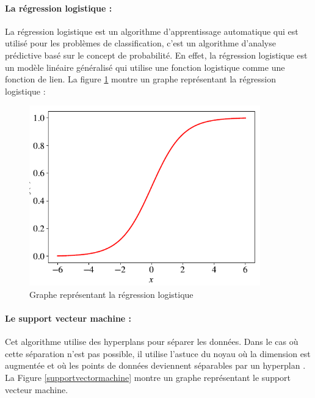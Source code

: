     \newpage

\paragraph{La régression logistique :}
La régression logistique est un algorithme d'apprentissage automatique qui est utilisé pour les problèmes de classification, c'est un algorithme d'analyse prédictive basé sur le concept de probabilité. En effet, la régression logistique est un modèle linéaire généralisé qui utilise une fonction logistique comme une fonction de lien. La figure \ref{lafonctionlogistique} montre un graphe représentant la régression logistique : 

\begin{figure}[h]
    \centering
    \includegraphics[width=10cm]{assets/PartOne/Chaptertwo/lafonctionlogistique.png}
    \caption{Graphe représentant la régression logistique}
    \label{lafonctionlogistique}
    \end{figure}


\paragraph{Le support vecteur machine : }
Cet algorithme utilise des hyperplans pour séparer les données. Dans le cas où cette séparation n'est pas possible, il utilise l'astuce du noyau où la dimension est augmentée et où les points de données deviennent séparables par un hyperplan \cite{RegressionAlgorithmsRegression2021}. La Figure \ref{supportvectormachine} montre un graphe représentant le support vecteur machine.


